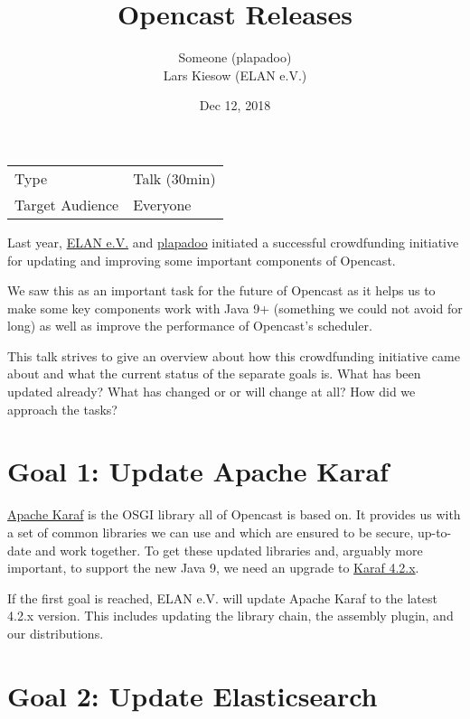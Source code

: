 \documentclass[a4paper]{article}
\title{Opencast Releases}
\date{Dec 12, 2018}
\author{
	Someone (plapadoo) \\
	Lars Kiesow (ELAN e.V.)
}
\begin{document}
\maketitle

\begin{center}
\begin{tabular}{ll}
\toprule
	Type            & Talk (30min) \\
	Target Audience & Everyone \\
\bottomrule
\end{tabular}
\end{center}

\vspace{1em}

Last year, \href{https://elan-ev.de}{ELAN e.V.} and
\href{https://plapadoo.com}{plapadoo} initiated a successful crowdfunding
initiative for updating and improving some important components of Opencast.

We saw this as an important task for the future of Opencast as it helps us to
make some key components work with Java 9+ (something we could not avoid for
long) as well as improve the performance of Opencast's scheduler.

This talk strives to give an overview about how this crowdfunding initiative
came about and what the current status of the separate goals is. What has been
updated already? What has changed or or will change at all? How did we approach the tasks?


\section*{Goal 1: Update Apache Karaf}

\href{https://karaf.apache.org/}{Apache Karaf} is the OSGI library all of Opencast is based on. It
provides us with a set of common libraries we can use and which are
ensured to be secure, up-to-date and work together. To get these
updated libraries and, arguably more important, to support the new Java
9, we need an upgrade to \href{https://karaf.apache.org/download.html}{Karaf 4.2.x}.

If the first goal is reached, ELAN e.V. will update Apache Karaf to the
latest 4.2.x version. This includes updating the library chain, the
assembly plugin, and our distributions.


\section*{Goal 2: Update Elasticsearch}
\end{document}
